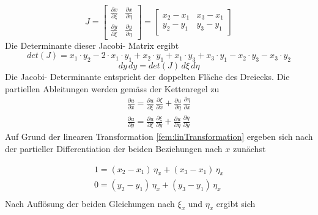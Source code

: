 \begin{equation}
J %
=
\begin{bmatrix}
    \frac{\partial x}{\partial \xi} &  \frac{\partial x}{\partial \eta}     \\
   \frac{\partial y}{\partial \xi}  &  \frac{\partial y}{\partial \eta}     
\end{bmatrix}
= 
\begin{bmatrix}
    x_2 - x_1  &  x_3 -x_1      \\
    y_2 - y_1  &  y_3 - y_1      
\end{bmatrix} 
	\label{fem:JocobiDeterminante}
\end{equation}
Die Determinante dieser Jacobi- Matrix ergibt
\begin{equation}
	det(J) = x_1 \cdot y_2 - 2 \cdot x_1 \cdot y_1 + x_2 \cdot y_1 + x_1\cdot y_3 + x_3 \cdot y_1 - x_2 \cdot y_3 - x_3 \cdot y_2
	\label{fem:JocobiDetBerechnet}
\end{equation}
\begin{equation}
			dy \, dy = det(J) \, d\xi \, d\eta
			\label{fem:newTransformation}
\end{equation}
Die Jacobi- Determinante entspricht der doppelten Fläche des Dreiecks. Die partiellen Ableitungen werden gemäss der Kettenregel zu 
\begin{equation}
\begin{split}
	\frac{\partial u}{\partial x} = \frac{\partial u}{\partial \xi} \, \frac{\partial \xi}{\partial x} + \frac{\partial u}{\partial \eta} \, \frac{\partial \eta}{\partial x} \\
	\frac{\partial u}{\partial y} = \frac{\partial u}{\partial \xi} \, \frac{\partial \xi}{\partial y} + \frac{\partial u}{\partial \eta} \, \frac{\partial \eta}{\partial y}
	\end{split}
\end{equation}
Auf Grund der linearen Transformation \eqref{fem:linTransformation} ergeben sich nach der partieller Differentiation der beiden Beziehungen nach $x$ zunächst

\begin{equation}
			\begin{aligned}
			1  = (x_2 -x_1) \, \eta_x + (x_3 -x_1) \, \eta_x \\
			0 = (y_2 -y_1) \, \eta_x + (y_3 -y_1) \, \eta_x \\
			 \end{aligned}
\end{equation}
Nach Auflösung  der beiden Gleichungen nach $\xi_x$ und $\eta_x$ ergibt sich

